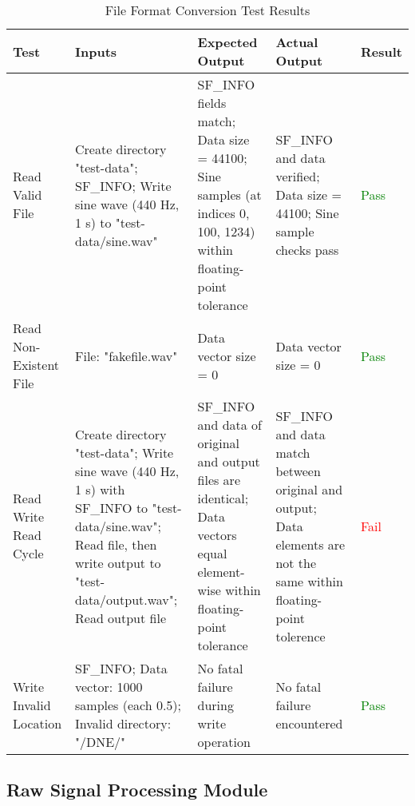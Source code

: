 \documentclass[12pt, titlepage]{article}
\begin{document}
\begin{longtable}{|L{3cm}|L{3cm}|L{2.5cm}|L{2.5cm}|l|}
  \caption{File Format Conversion Test Results} \\
  \hline
  \textbf{Test} & \textbf{Inputs} & \textbf{Expected Output} & \textbf{Actual Output} & \textbf{Result} \\
  \hline
  Read Valid File & 
    Create directory "test-data"; \newline
    SF\_INFO; \newline
    Write sine wave (440 Hz, 1 s) to "test-data/sine.wav" & 
    SF\_INFO fields match; \newline
    Data size = 44100; \newline
    Sine samples (at indices 0, 100, 1234) within floating-point tolerance & 
    SF\_INFO and data verified; \newline
    Data size = 44100; \newline
    Sine sample checks pass & \textcolor{green}{Pass} \\
  \hline
  Read Non-Existent File & 
    File: "fakefile.wav" & 
    Data vector size = 0 & 
    Data vector size = 0 & \textcolor{green}{Pass} \\
  \hline
  Read Write Read Cycle & 
    Create directory "test-data"; \newline
    Write sine wave (440 Hz, 1 s) with SF\_INFO to "test-data/sine.wav"; \newline
    Read file, then write output to "test-data/output.wav"; \newline
    Read output file & 
    SF\_INFO and data of original and output files are identical; \newline
    Data vectors equal element-wise within floating-point tolerance & 
    SF\_INFO and data match between original and output; \newline
    Data elements are not the same within floating-point tolerence & 
    \textcolor{red}{Fail} \\
  \hline
  Write Invalid Location & 
    SF\_INFO; \newline
    Data vector: 1000 samples (each 0.5); \newline
    Invalid directory: "/DNE/" & 
    No fatal failure during write operation & 
    No fatal failure encountered & \textcolor{green}{Pass} \\
  \hline
\end{longtable}

\subsection{Raw Signal Processing Module}
\end{document}
